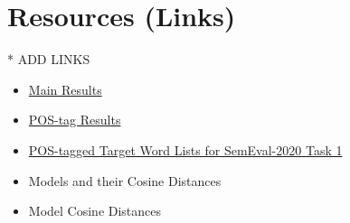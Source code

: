 \section{Resources (Links)}
\label{app-resources}

* ADD LINKS
\begin{itemize}

  \item \href{https://github.com/kateviloria/Semantic-Change-Thesis/blob/main/results/MAIN_ALL.csv}{Main Results}
  \item \href{https://github.com/kateviloria/Semantic-Change-Thesis/blob/main/results/postag-results/MAIN_POS_RESULTS.csv}{POS-tag Results}
  \item \href{https://github.com/kateviloria/Semantic-Change-Thesis/tree/main/truth-labels}{POS-tagged Target Word Lists for SemEval-2020 Task 1}
  \item Models and their Cosine Distances
  \item Model Cosine Distances
\end{itemize}